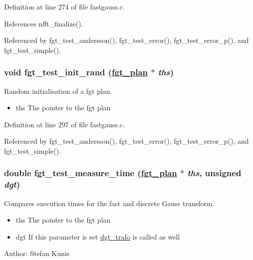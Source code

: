 Definition at line 274 of file fastgauss.c.

References nfft\_\-finalize().

Referenced by fgt\_\-test\_\-andersson(), fgt\_\-test\_\-error(), fgt\_\-test\_\-error\_\-p(), and fgt\_\-test\_\-simple().\hypertarget{group__applications__fastgauss_ga6}{
\subsubsection[fgt\_\-test\_\-init\_\-rand]{\setlength{\rightskip}{0pt plus 5cm}void fgt\_\-test\_\-init\_\-rand (\hyperlink{structfgt__plan}{fgt\_\-plan} $\ast$ {\em ths})}}
\label{group__applications__fastgauss_ga6}


Random initialisation of a fgt plan. 

\begin{itemize}
\item ths The pointer to the fgt plan 
\end{itemize}


Definition at line 297 of file fastgauss.c.

Referenced by fgt\_\-test\_\-andersson(), fgt\_\-test\_\-error(), fgt\_\-test\_\-error\_\-p(), and fgt\_\-test\_\-simple().\hypertarget{group__applications__fastgauss_ga7}{
\subsubsection[fgt\_\-test\_\-measure\_\-time]{\setlength{\rightskip}{0pt plus 5cm}double fgt\_\-test\_\-measure\_\-time (\hyperlink{structfgt__plan}{fgt\_\-plan} $\ast$ {\em ths}, unsigned {\em dgt})}}
\label{group__applications__fastgauss_ga7}


Compares execution times for the fast and discrete Gauss transform. 

\begin{itemize}
\item ths The pointer to the fgt plan \item dgt If this parameter is set \hyperlink{group__applications__fastgauss_ga0}{dgt\_\-trafo} is called as well\end{itemize}
\begin{Desc}
\item[Author:]Stefan Kunis \end{Desc}


